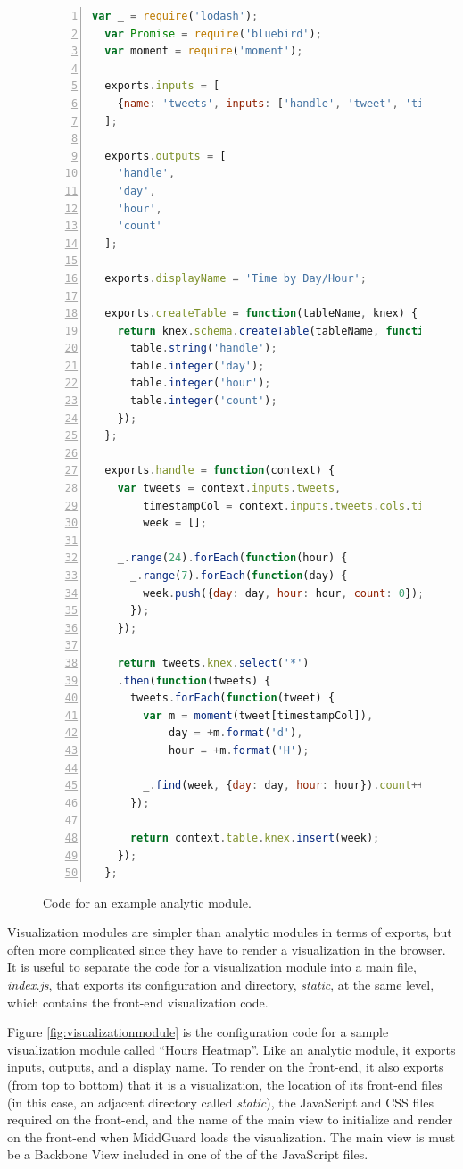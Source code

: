 \documentclass[midd]{thesis}
\begin{document}
\begin{figure}[!ht]
  \centering
  \begin{lstlisting}[numbers=left,
                     numberstyle=\footnotesize,
                     numbersep=5pt,
                     language=javascript,
                     gobble=2]
  var _ = require('lodash');
  var Promise = require('bluebird');
  var moment = require('moment');

  exports.inputs = [
    {name: 'tweets', inputs: ['handle', 'tweet', 'timestamp']}
  ];

  exports.outputs = [
    'handle',
    'day',
    'hour',
    'count'
  ];

  exports.displayName = 'Time by Day/Hour';

  exports.createTable = function(tableName, knex) {
    return knex.schema.createTable(tableName, function(table) {
      table.string('handle');
      table.integer('day');
      table.integer('hour');
      table.integer('count');
    });
  };

  exports.handle = function(context) {
    var tweets = context.inputs.tweets,
        timestampCol = context.inputs.tweets.cols.timestamp,
        week = [];

    _.range(24).forEach(function(hour) {
      _.range(7).forEach(function(day) {
        week.push({day: day, hour: hour, count: 0});
      });
    });

    return tweets.knex.select('*')
    .then(function(tweets) {
      tweets.forEach(function(tweet) {
        var m = moment(tweet[timestampCol]),
            day = +m.format('d'),
            hour = +m.format('H');

        _.find(week, {day: day, hour: hour}).count++;
      });

      return context.table.knex.insert(week);
    });
  };
  \end{lstlisting}

  \caption{Code for an example analytic module.}
  \label{fig:analyticmodule}
\end{figure}

Visualization modules are simpler than analytic modules in terms of exports, but
often more complicated since they have to render a visualization in the browser.
It is useful to separate the code for a visualization module into a main file,
\textit{index.js}, that exports its configuration and directory,
\textit{static}, at the same level, which contains the front-end visualization
code.

Figure \ref{fig:visualizationmodule} is the configuration code for a sample
visualization module called ``Hours Heatmap''. Like an analytic module, it
exports inputs, outputs, and a display name. To render on the front-end, it also
exports (from top to bottom) that it is a visualization, the location of its
front-end files (in this case, an adjacent directory called \textit{static}),
the JavaScript and CSS files required on the front-end, and the name of the main
view to initialize and render on the front-end when MiddGuard loads the
visualization. The main view is must be a Backbone View included in one of the
of the JavaScript files.
\end{document}
